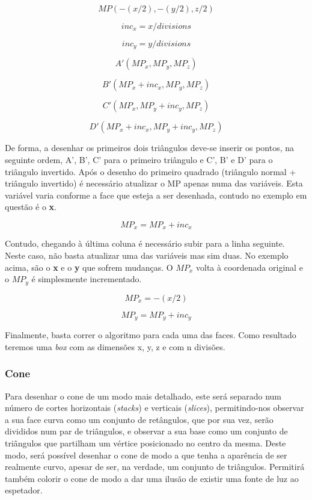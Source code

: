 \documentclass[a4paper]{article}
\begin{document}
\[ MP (-(x/2), -(y/2), z/2) \]

\[ inc_x = x / divisions \]

\[ inc_y = y / divisions \]

\[ A'(MP_x, MP_y, MP_z) \]

\[ B'(MP_x + inc_x, MP_y, MP_z) \]

\[ C'(MP_x, MP_y + inc_y, MP_z) \]

\[ D'(MP_x + inc_x, MP_y + inc_y, MP_z) \]

\hspace{3mm} De forma, a  desenhar os primeiros dois triângulos deve-se inserir os pontos, na seguinte ordem, A', B', C' para o primeiro triângulo e C', B' e D' para o triângulo invertido. Após o desenho do primeiro quadrado (triângulo normal + triângulo invertido) é necessário atualizar o MP apenas numa das variáveis. Esta variável varia conforme a face que esteja a ser desenhada, contudo no exemplo em questão é o \textbf{x}.

\[ MP_x = MP_x + inc_x \]

\hspace{3mm} Contudo, chegando à última coluna é necessário subir para a linha seguinte. Neste caso, não basta atualizar uma das variáveis mas sim duas. No exemplo acima, são o \textbf{x} e o \textbf{y} que sofrem mudanças. O \(MP_x\) volta à coordenada original e o \(MP_y\) é simplesmente incrementado.

\[ MP_x = -(x/2) \]

\[ MP_y = MP_y + inc_y \]

\hspace{3mm} Finalmente, basta correr o algoritmo para cada uma das faces. Como resultado teremos uma \textit{box} com as dimensões x, y, z e com n divisões.



\subsubsection{Cone} %

\hspace{8mm} Para desenhar o cone de um modo mais detalhado, este será separado num número de cortes horizontais (\emph{stacks}) e verticais (\emph{slices}), permitindo-nos observar a sua face curva como um conjunto de retângulos, que por sua vez, serão divididos num par de triângulos, e observar a sua base como um conjunto de triângulos que partilham um vértice posicionado no centro da mesma.  Deste modo, será possível desenhar o cone de modo a que tenha a aparência de ser realmente curvo, apesar de ser, na verdade, um conjunto de triângulos. Permitirá também colorir o cone de modo a dar uma ilusão de existir uma fonte de luz ao espetador.
\end{document}
